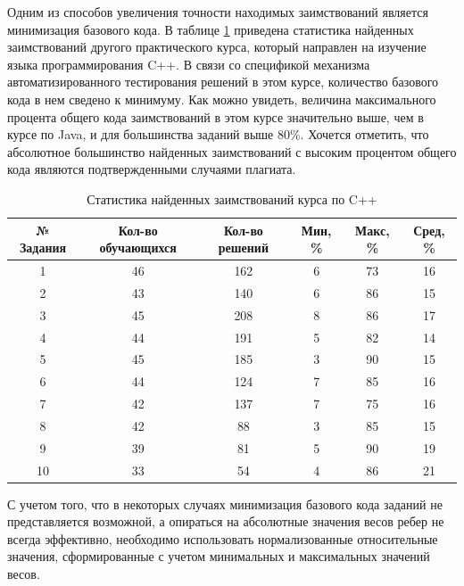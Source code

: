 \documentclass[a4paper,14pt]{extarticle}
\begin{document}
Одним из способов увеличения точности находимых заимствований является минимизация базового кода. В таблице \ref{tab:cppCourseStats} приведена статистика найденных заимствований другого практического курса, который направлен на изучение языка программирования C++. В связи со спецификой механизма автоматизированного тестирования решений в этом курсе, количество базового кода в нем сведено к минимуму. Как можно увидеть, величина максимального процента общего кода заимствований в этом курсе значительно выше, чем в курсе по Java, и для большинства заданий выше 80\%. Хочется отметить, что абсолютное большинство найденных заимствований с высоким процентом общего кода являются подтвержденными случаями плагиата.

\begin{table}[htb]
    \centering
    \begin{tabular}{cccccc}
        \toprule
        № Задания & Кол-во обучающихся & Кол-во решений & Мин, \% & Макс, \% & Сред, \% \\
        \toprule
        1 & 46 & 162 & 6 & 73 & 16 \\
        \midrule
        2 & 43 & 140 & 6 & 86 & 15 \\
        \midrule
        3 & 45 & 208 & 8 & 86 & 17 \\
        \midrule
        4 & 44 & 191 & 5 & 82 & 14 \\
        \midrule
        5 & 45 & 185 & 3 & 90 & 15 \\
        \midrule
        6 & 44 & 124 & 7 & 85 & 16 \\
        \midrule
        7 & 42 & 137 & 7 & 75 & 16 \\
        \midrule
        8 & 42 & 88 & 3 & 85 & 15 \\
        \midrule
        9 & 39 & 81 & 5 & 90 & 19 \\
        \midrule
        10 & 33 & 54 & 4 & 86 & 21 \\
        \bottomrule
    \end{tabular}
    \caption{Статистика найденных заимствований курса по C++}
    \label{tab:cppCourseStats}
\end{table}

С учетом того, что в некоторых случаях минимизация базового кода заданий не представляется возможной, а опираться на абсолютные значения весов ребер не всегда эффективно, необходимо использовать нормализованные относительные значения, сформированные с учетом минимальных и максимальных значений весов.
\end{document}
